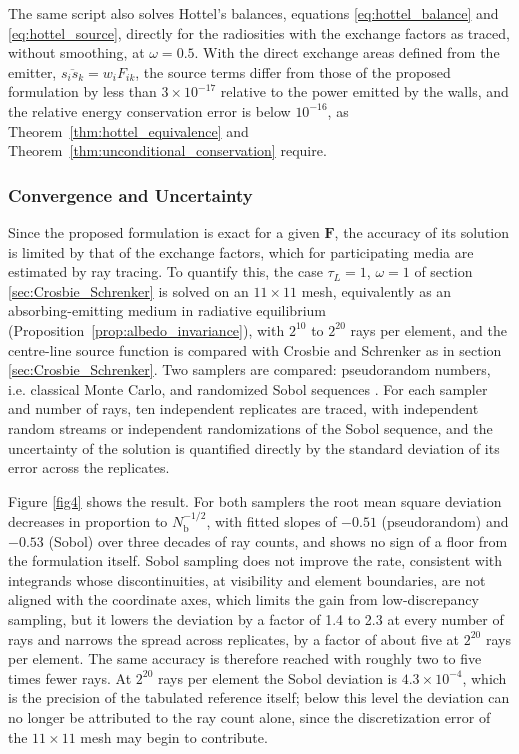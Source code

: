 \documentclass[preprint,1p,times]{elsarticle}
\theoremstyle{plain}
\theoremstyle{definition}
\theoremstyle{remark}
\begin{document}
The same script also solves Hottel's balances, equations \eqref{eq:hottel_balance} and \eqref{eq:hottel_source}, directly for the radiosities with the exchange factors as traced, without smoothing, at $\omega = 0.5$. With the direct exchange areas defined from the emitter, $\overline{s_i s_k} = w_i F_{ik}$, the source terms differ from those of the proposed formulation by less than $3\times 10^{-17}$ relative to the power emitted by the walls, and the relative energy conservation error is below $10^{-16}$, as Theorem~\ref{thm:hottel_equivalence} and Theorem~\ref{thm:unconditional_conservation} require.

\subsubsection{Convergence and Uncertainty}
\label{sec:convergence}

Since the proposed formulation is exact for a given $\mathbf{F}$, the accuracy of its solution is limited by that of the exchange factors, which for participating media are estimated by ray tracing. To quantify this, the case $\tau_L = 1$, $\omega = 1$ of section \ref{sec:Crosbie_Schrenker} is solved on an $11\times 11$ mesh, equivalently as an absorbing-emitting medium in radiative equilibrium (Proposition~\ref{prop:albedo_invariance}), with $2^{10}$ to $2^{20}$ rays per element, and the centre-line source function is compared with Crosbie and Schrenker \citep{Crosbie1984} as in section \ref{sec:Crosbie_Schrenker}. Two samplers are compared: pseudorandom numbers, i.e. classical Monte Carlo, and randomized Sobol sequences \citep{Sobol1967, JoeKuo2008}. For each sampler and number of rays, ten independent replicates are traced, with independent random streams or independent randomizations of the Sobol sequence, and the uncertainty of the solution is quantified directly by the standard deviation of its error across the replicates.

Figure \ref{fig4} shows the result. For both samplers the root mean square deviation decreases in proportion to $N_\mathrm{b}^{-1/2}$, with fitted slopes of $-0.51$ (pseudorandom) and $-0.53$ (Sobol) over three decades of ray counts, and shows no sign of a floor from the formulation itself. Sobol sampling does not improve the rate, consistent with integrands whose discontinuities, at visibility and element boundaries, are not aligned with the coordinate axes, which limits the gain from low-discrepancy sampling, but it lowers the deviation by a factor of 1.4 to 2.3 at every number of rays and narrows the spread across replicates, by a factor of about five at $2^{20}$ rays per element. The same accuracy is therefore reached with roughly two to five times fewer rays. At $2^{20}$ rays per element the Sobol deviation is $4.3\times 10^{-4}$, which is the precision of the tabulated reference itself; below this level the deviation can no longer be attributed to the ray count alone, since the discretization error of the $11\times 11$ mesh may begin to contribute.
\end{document}
